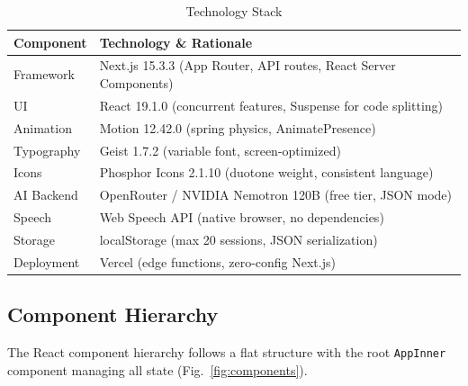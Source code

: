 \documentclass[11pt]{article}
\begin{document}
\begin{table}[!t]
\centering
\caption{Technology Stack}
\label{tab:stack}
\begin{tabularx}{\columnwidth}{lX}
\toprule
\textbf{Component} & \textbf{Technology \& Rationale} \\
\midrule
Framework & Next.js 15.3.3 (App Router, API routes, React Server Components) \\
UI & React 19.1.0 (concurrent features, Suspense for code splitting) \\
Animation & Motion 12.42.0 (spring physics, AnimatePresence) \\
Typography & Geist 1.7.2 (variable font, screen-optimized) \\
Icons & Phosphor Icons 2.1.10 (duotone weight, consistent language) \\
AI Backend & OpenRouter / NVIDIA Nemotron 120B (free tier, JSON mode) \\
Speech & Web Speech API (native browser, no dependencies) \\
Storage & localStorage (max 20 sessions, JSON serialization) \\
Deployment & Vercel (edge functions, zero-config Next.js) \\
\bottomrule
\end{tabularx}
\end{table}

\subsection{Component Hierarchy}

The React component hierarchy follows a flat structure with the root \texttt{AppInner} component managing all state (Fig.~\ref{fig:components}).
\end{document}

